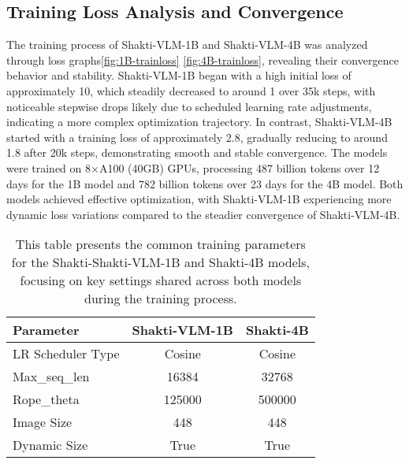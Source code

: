 \documentclass{article}
\begin{document}
\subsection{Training Loss Analysis and Convergence}
The training process of Shakti-VLM-1B and Shakti-VLM-4B was analyzed through loss graphs\ref{fig:1B-trainloss} \ref{fig:4B-trainloss}, revealing their convergence behavior and stability. Shakti-VLM-1B began with a high initial loss of approximately 10, which steadily decreased to around 1 over 35k steps, with noticeable stepwise drops likely due to scheduled learning rate adjustments, indicating a more complex optimization trajectory. In contrast, Shakti-VLM-4B started with a training loss of approximately 2.8, gradually reducing to around 1.8 after 20k steps, demonstrating smooth and stable convergence. The models were trained on 8×A100 (40GB) GPUs, processing 487 billion tokens over 12 days for the 1B model and 782 billion tokens over 23 days for the 4B model. Both models achieved effective optimization, with Shakti-VLM-1B experiencing more dynamic loss variations compared to the steadier convergence of Shakti-VLM-4B.


\begin{table}[h]
    \centering
     \renewcommand{\arraystretch}{1.3}
    \begin{tabular}{|l|c|c|}
        \hline
        \textbf{Parameter}        & \textbf{Shakti-VLM-1B} & \textbf{Shakti-4B} \\
        \hline
        LR Scheduler Type         & Cosine             & Cosine             \\
        \hline
        Max\_seq\_len             & 16384              & 32768              \\
        \hline
        Rope\_theta               & 125000             & 500000             \\
        \hline
        Image Size                & 448                & 448                \\
        \hline
        Dynamic Size              & True               & True               \\
        \hline
    \end{tabular}
    \vspace{0.5cm}
    \caption{This table presents the common training parameters for the Shakti-Shakti-VLM-1B and Shakti-4B models, focusing on key settings shared across both models during the training process.}
    \label{table:shakti-vlm-training-parameters}
\end{table}
\end{document}
